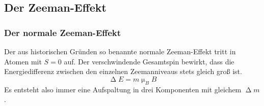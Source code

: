 \subsection{Der Zeeman-Effekt}
\subsubsection{Der normale Zeeman-Effekt}
Der aus historischen Gründen so benannte normale Zeeman-Effekt tritt in Atomen mit $S=0$ auf. Der verschwindende Gesamtspin bewirkt, dass die Energiedifferenz zwischen den einzelnen Zeemanniveaus stets gleich groß ist.
\begin{equation}
  \upDelta E=m\upmu_B B
\end{equation}
Es entsteht also immer eine Aufspaltung in drei Komponenten mit gleichem $\upDelta m$.
